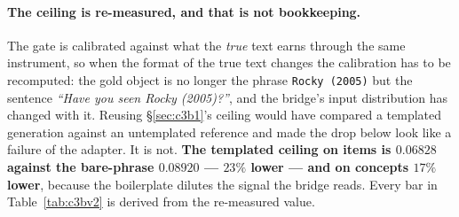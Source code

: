 \documentclass[11pt]{article}
\begin{document}
\paragraph{The ceiling is re-measured, and that is not bookkeeping.} The gate is calibrated against
what the \emph{true} text earns through the same instrument, so when the format of the true text
changes the calibration has to be recomputed: the gold object is no longer the phrase
\texttt{Rocky (2005)} but the sentence \emph{``Have you seen Rocky (2005)?''}, and the bridge's input
distribution has changed with it. Reusing \S\ref{sec:c3b1}'s ceiling would have compared a templated
generation against an untemplated reference and made the drop below look like a failure of the
adapter. It is not. \textbf{The templated ceiling on items is $0.06828$ against the bare-phrase
$0.08920$ --- $23\%$ lower --- and on concepts $17\%$ lower}, because the boilerplate dilutes the
signal the bridge reads. Every bar in Table~\ref{tab:c3bv2} is derived from the re-measured value.
\end{document}
